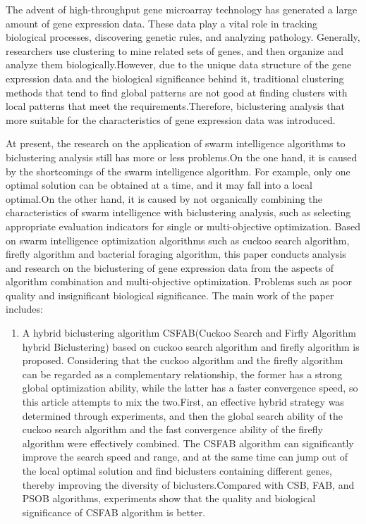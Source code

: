 \begin{eabstract}
  The advent of high-throughput gene microarray technology has generated a large amount of gene expression data. These data play a vital role in tracking biological processes, discovering genetic rules, and analyzing pathology. Generally, researchers use clustering to mine related sets of genes, and then organize and analyze them biologically.However, due to the unique data structure of the gene expression data and the biological significance behind it, traditional clustering methods that tend to find global patterns are not good at finding clusters with local patterns that meet the requirements.Therefore, biclustering analysis that more suitable for the characteristics of gene expression data was introduced.
  

  At present, the research on the application of swarm intelligence algorithms to biclustering analysis still has more or less problems.On the one hand, it is caused by the shortcomings of the swarm intelligence algorithm. For example, only one optimal solution can be obtained at a time, and it may fall into a local optimal.On the other hand, it is caused by not organically combining the characteristics of swarm intelligence with biclustering analysis, such as selecting appropriate evaluation indicators for single or multi-objective optimization. Based on swarm intelligence optimization algorithms such as cuckoo search algorithm, firefly algorithm and bacterial foraging algorithm, this paper conducts analysis and research on the biclustering of gene expression data from the aspects of algorithm combination and multi-objective optimization. Problems such as poor quality and insignificant biological significance. The main work of the paper includes:
  
  \begin{enumerate}
    \item {  A hybrid biclustering algorithm CSFAB(Cuckoo Search and Firfly Algorithm hybrid Biclustering) based on cuckoo search algorithm and firefly algorithm is proposed. Considering that the cuckoo algorithm and the firefly algorithm can be regarded as a complementary relationship, the former has a strong global optimization ability, while the latter has a faster convergence speed, so this article attempts to mix the two.First, an effective hybrid strategy was determined through experiments, and then the global search ability of the cuckoo search algorithm and the fast convergence ability of the firefly algorithm were effectively combined. The CSFAB algorithm can significantly improve the search speed and range, and at the same time can jump out of the local optimal solution and find biclusters containing different genes, thereby improving the diversity of biclusters.Compared with CSB, FAB, and PSOB algorithms, experiments show that the quality and biological significance of CSFAB algorithm is better.}


\end{enumerate}
\end{eabstract}

